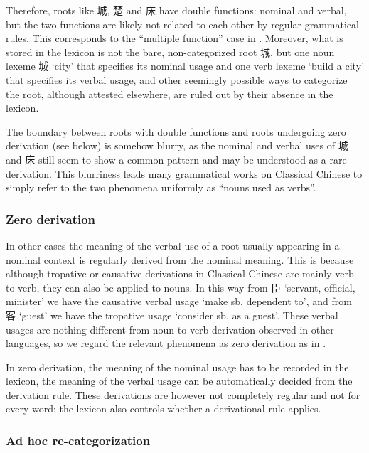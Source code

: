 \documentclass[UTF8, a4paper, oneside, scheme=plain, 12pt]{ctexrep}
\newcommand*{\citesec}[1]{\S~{#1}}
\newcommand{\translate}[1]{`#1'}
\begin{document}
Therefore, roots like 城, 楚 and 床 have double functions: nominal and verbal,
but the two functions are likely not related to each other by regular grammatical rules.
This corresponds to the ``multiple function'' case in \citet[\citesec{11.3}]{dixon2010basic2}.
Moreover, what is stored in the lexicon is not the bare, non-categorized root 城,
but one noun lexeme 城 \translate{city} that specifies its nominal usage 
and one verb lexeme \translate{build a city} that specifies its verbal usage,
and other seemingly possible ways to categorize the root, although attested elsewhere,
are ruled out by their absence in the lexicon.

The boundary between roots with double functions and roots undergoing zero derivation (see below) 
is somehow blurry,
as the nominal and verbal uses of 城 and 床 still seem to show a common pattern
and may be understood as a rare derivation.
This blurriness leads many grammatical works on Classical Chinese 
to simply refer to the two phenomena uniformly as ``nouns used as verbs''.

\subsubsection{Zero derivation}

In other cases the meaning of the verbal use of a root usually appearing in a nominal context
is regularly derived from the nominal meaning.
This is because although tropative or causative derivations in Classical Chinese
are mainly verb-to-verb,
they can also be applied to nouns.
In this way from 臣 \translate{servant, official, minister}
we have the causative verbal usage \translate{make sb. dependent to},
and from 客 \translate{guest} we have the tropative usage \translate{consider sb. as a guest}.
These verbal usages are nothing different from noun-to-verb derivation observed in other languages,
so we regard the relevant phenomena as zero derivation as in \citet[\citesec{11.3}]{dixon2010basic2}.

In zero derivation, the meaning of the nominal usage has to be recorded in the lexicon,
the meaning of the verbal usage can be automatically decided from the derivation rule.
These derivations are however not completely regular and not for every word:
the lexicon also controls whether a derivational rule applies.

\subsubsection{Ad hoc re-categorization}
\end{document}
